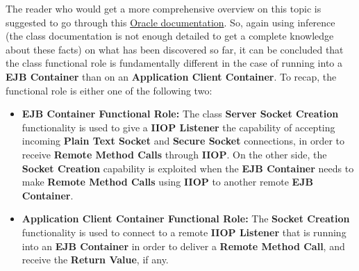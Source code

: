 The reader who would get a more comprehensive overview on this topic is suggested to go through this \href{https://docs.oracle.com/javaee/7/firstcup/java-ee002.htm}{Oracle documentation}.
So, again using inference (the class documentation is not enough detailed to get a complete knowledge about these facts) on what has been discovered so far, it can be concluded that the class functional role is fundamentally different in the case of running into a \textbf{EJB Container} than on an \textbf{Application Client Container}.
To recap, the functional role is either one of the following two:
\begin{itemize}
	\item \textbf{EJB Container Functional Role:}
		The class \textbf{Server Socket Creation} functionality is used to give a \textbf{IIOP Listener} the capability of accepting incoming \textbf{Plain Text Socket} and \textbf{Secure Socket} connections, in order to receive \textbf{Remote Method Calls} through \textbf{IIOP}.
		On the other side, the \textbf{Socket Creation} capability is exploited when the \textbf{EJB Container} needs to make \textbf{Remote Method Calls} using \textbf{IIOP} to another remote \textbf{EJB Container}.
	\item \textbf{Application Client Container Functional Role:}
		The \textbf{Socket Creation} functionality is used to connect to a remote \textbf{IIOP Listener} that is running into an \textbf{EJB Container} in order to deliver a \textbf{Remote Method Call}, and receive the \textbf{Return Value}, if any.
\end{itemize}

